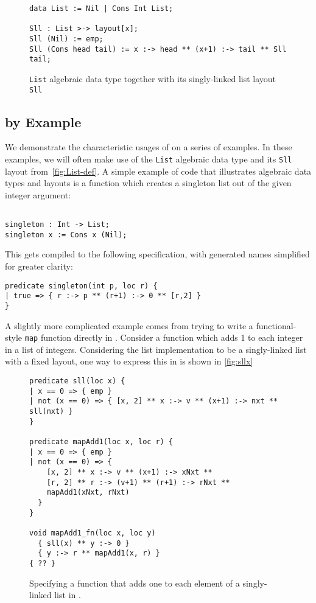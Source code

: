 \begin{figure}[t]
\begin{lstlisting}[language=Pika]
data List := Nil | Cons Int List;

Sll : List >-> layout[x];
Sll (Nil) := emp;
Sll (Cons head tail) := x :-> head ** (x+1) :-> tail ** Sll tail;
\end{lstlisting}
  \caption{\lstinline{List} algebraic data type together with its singly-linked list layout \lstinline{Sll}}
  \label{fig:List-def}
\end{figure}



\subsection{\Pika{} by Example}

We demonstrate the characteristic usages of \Pika{} on a series of
examples.
%
In these examples, we will often make use of the \verb|List| algebraic
data type and its \verb|Sll| layout from~\autoref{fig:List-def}. A
simple example of \Pika{} code that illustrates algebraic data types and
layouts is a function which creates a singleton list out of the given
integer argument:

\begin{lstlisting}[language=Pika]
%generate singleton [Int] Sll

singleton : Int -> List;
singleton x := Cons x (Nil);
\end{lstlisting}

\noindent
This gets compiled to the following \SuSLik{} specification, with generated names simplified for greater clarity:

\begin{lstlisting}[language=SynLang]
predicate singleton(int p, loc r) {
| true => { r :-> p ** (r+1) :-> 0 ** [r,2] }
}
\end{lstlisting}

\noindent
A slightly more complicated example comes from trying to write a
functional-style \verb|map| function directly in \SuSLik. Consider a
function which adds 1 to each integer in a list of integers.
Considering the list implementation to be a singly-linked list with a
fixed layout, one way to express this in \SuSLik{} is shown in \autoref{fig:sllx}

\begin{figure}[t]
  \begin{lstlisting}[language=SynLang]
predicate sll(loc x) {
| x == 0 => { emp }
| not (x == 0) => { [x, 2] ** x :-> v ** (x+1) :-> nxt ** sll(nxt) }
}

predicate mapAdd1(loc x, loc r) {
| x == 0 => { emp }
| not (x == 0) => {
    [x, 2] ** x :-> v ** (x+1) :-> xNxt **
    [r, 2] ** r :-> (v+1) ** (r+1) :-> rNxt **
    mapAdd1(xNxt, rNxt)
  }
}

void mapAdd1_fn(loc x, loc y)
  { sll(x) ** y :-> 0 }
  { y :-> r ** mapAdd1(x, r) }
{ ?? }
\end{lstlisting}
\caption{Specifying a function that adds one to each element of a
  singly-linked list in \SuSLik.}
\label{fig:sllx}
\end{figure}

